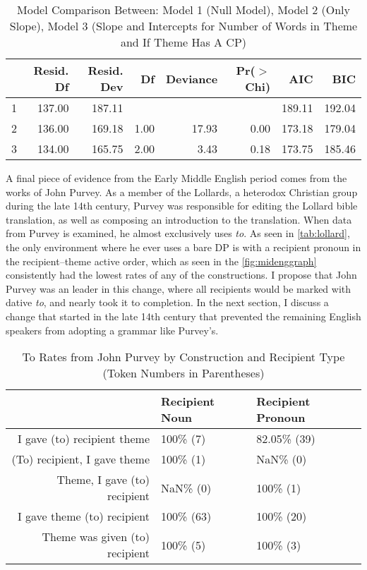 \begin{table}[ht]
\centering
\begin{tabular}{rrrrrrrr}
  \hline
 & Resid. Df & Resid. Dev & Df & Deviance & Pr($>$Chi) & AIC & BIC \\ 
  \hline
1 & 137.00 & 187.11 &  &  &  & 189.11 & 192.04 \\ 
  2 & 136.00 & 169.18 & 1.00 & 17.93 & 0.00 & 173.18 & 179.04 \\ 
  3 & 134.00 & 165.75 & 2.00 & 3.43 & 0.18 & 173.75 & 185.46 \\ 
   \hline
\end{tabular}
\caption{Model Comparison Between: Model 1 (Null Model), Model 2 (Only Slope), Model 3 (Slope and Intercepts for Number of Words in Theme and If Theme Has A CP)} 
\end{table}



A final piece of evidence from the Early Middle English period comes from the works of John Purvey. As a member of the Lollards, a heterodox Christian group during the late 14th century, Purvey was responsible for editing the Lollard bible translation, as well as composing an introduction to the translation. When data from Purvey is examined, he almost exclusively uses \emph{to}. As seen in \autoref{tab:lollard}, the only environment where he ever uses a bare DP is with a recipient pronoun in the recipient--theme active order, which as seen in the \autoref{fig:midenggraph} consistently had the lowest rates of any of the constructions. I propose that John Purvey was an leader in this change, where all recipients would be marked with dative \emph{to}, and nearly took it to completion. In the next section, I discuss a change that started in the late 14th century that prevented the remaining English speakers from adopting a grammar like Purvey's.




\begin{table}[ht]
\centering
\begin{tabular}{rll}
  \hline
 & Recipient Noun & Recipient Pronoun \\ 
  \hline
I gave (to) recipient theme & 100\% (7) & 82.05\% (39) \\ 
  (To) recipient, I gave theme & 100\% (1) & NaN\% (0) \\ 
  Theme, I gave (to) recipient & NaN\% (0) & 100\% (1) \\ 
  I gave theme (to) recipient & 100\% (63) & 100\% (20) \\ 
  Theme was given (to) recipient & 100\% (5) & 100\% (3) \\ 
   \hline
\end{tabular}
\caption{To Rates from John Purvey by Construction and Recipient Type (Token Numbers in Parentheses)} 
\label{tab:lollard}
\end{table}


